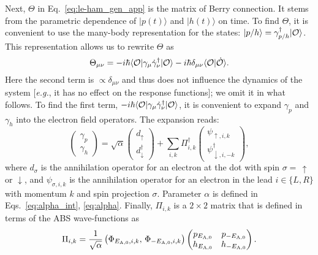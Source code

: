 \documentclass[aps,reprint,longbibliography, prb]{revtex4-2}
\begin{document}
Next, $\Theta$ in Eq.~\eqref{eq:le-ham_gen_app} is the matrix of Berry connection. It stems from the parametric dependence of $|p(t)\rangle$ and $|h(t)\rangle$ on time. To find $\Theta$, it is convenient to use the many-body representation for the states: $|p/h\rangle = \gamma^\dagger_{p/h}|{\cal O}\rangle$. This representation allows us to rewrite $\Theta$ as
\begin{equation}\label{eq:theta_app}
    \Theta_{\mu\nu} = -i\hbar\langle {\cal O} | \gamma_{\mu} \dot{\gamma}^\dagger_{\nu} | {\cal O}\rangle -i\hbar\delta_{\mu\nu} \langle {\cal O} | \dot{\cal O}\rangle.
\end{equation}
Here the second term is $\propto \delta_{\mu\nu}$ and thus does not influence the dynamics of the system [\textit{e.g.}, it has no effect on the response functions]; we omit it in what follows.   To find the first term, $-i\hbar\langle {\cal O} | \gamma_{\mu} \dot{\gamma}^\dagger_{\nu} | {\cal O}\rangle$, it is convenient to expand $\gamma_{p}$ and $\gamma_h$ into the electron field operators. The expansion reads:
\begin{equation}\label{eq:decomp_app}
        \begin{pmatrix}
        \gamma_p\\\gamma_h
        \end{pmatrix}
        =
        \sqrt{\alpha}
        \begin{pmatrix}
        d_{\uparrow}\\
        d_{\downarrow}^\dagger
        \end{pmatrix}
        + \sum_{i, k} \Pi^\dagger_{i,k}
        \begin{pmatrix}
        \psi_{\uparrow, i,k}\\
        \psi^\dagger_{\downarrow, i,-k}
        \end{pmatrix},
\end{equation}
where $d_\sigma$ is the annihilation operator for an electron at the dot with spin $\sigma =\,\uparrow$ or $\downarrow$, and $\psi_{\sigma, i,k}$ is the annihilation operator for an electron in the lead $i\in \{L, R\}$ with momentum $k$ and spin projection $\sigma$. Parameter $\alpha$ is defined in Eqs.~\eqref{eq:alpha_int}, \eqref{eq:alpha}. Finally, $\Pi_{i,k}$ is a $2 \times 2$ matrix that is defined in terms of the ABS wave-functions as
\begin{equation}
    \Pi_{i,k} = \frac{1}{\sqrt{\alpha}} \left(\Phi_{E_{\rm A, 0},i,k},\, \Phi_{-E_{\rm A, 0}, i, k}\right) 
    \begin{pmatrix}
        p_{E_{\rm A, 0}} & p_{-E_{\rm A, 0}}\\
        h_{E_{\rm A, 0}} & h_{-E_{\rm A, 0}}
    \end{pmatrix}.
\end{equation}
\end{document}
